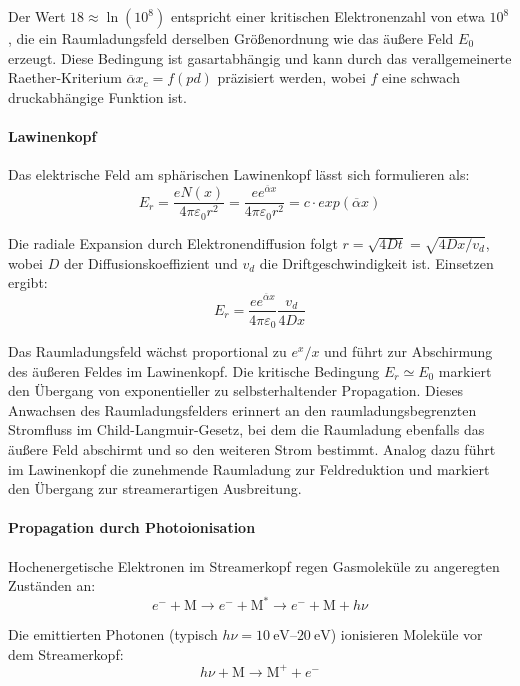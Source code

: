 Der Wert $18 \approx \ln(10^8)$ entspricht einer kritischen Elektronenzahl von etwa $10^8$, die ein Raumladungsfeld derselben Größenordnung wie das äußere Feld $E_0$ erzeugt. Diese Bedingung ist gasartabhängig und kann durch das verallgemeinerte Raether-Kriterium $\overline{\alpha} x_c = f(pd)$ präzisiert werden, wobei $f$ eine schwach druckabhängige Funktion ist.


\paragraph{Lawinenkopf}
Das elektrische Feld am sphärischen Lawinenkopf lässt sich formulieren als:
\begin{equation}
    E_r = \frac{e N(x)}{4\pi \varepsilon_0 r^2} = \frac{e e^{\overline{\alpha}x}}{4\pi \varepsilon_0 r^2} = c \cdot exp(\overline\alpha x)
    \label{eq:electronlawfield}
\end{equation}

Die radiale Expansion durch Elektronendiffusion folgt $r = \sqrt{4Dt} = \sqrt{4Dx/v_d}$, wobei $D$ der Diffusionskoeffizient und $v_d$ die Driftgeschwindigkeit ist. Einsetzen ergibt:
\begin{equation}
    E_r = \frac{e e^{\overline{\alpha}x}}{4\pi \varepsilon_0} \frac{v_d}{4Dx}
    \label{eq:electronlawfielddif}
\end{equation}

Das Raumladungsfeld wächst proportional zu $e^x/x$ und führt zur Abschirmung des äußeren Feldes im Lawinenkopf. Die kritische Bedingung $E_r \simeq E_0$ markiert den Übergang von exponentieller zu selbsterhaltender Propagation.
Dieses Anwachsen des Raumladungsfelders erinnert an den raumladungsbegrenzten Stromfluss im Child-Langmuir-Gesetz, bei dem die Raumladung ebenfalls das äußere Feld abschirmt und so den weiteren Strom bestimmt. Analog dazu führt im Lawinenkopf die zunehmende Raumladung zur Feldreduktion und markiert den Übergang zur streamerartigen Ausbreitung.


\paragraph{Propagation durch Photoionisation}
Hochenergetische Elektronen im Streamerkopf regen Gasmoleküle zu angeregten Zuständen an:
\begin{equation}
    e^- + \text{M} \rightarrow e^- + \text{M}^* \rightarrow e^- + \text{M} + h\nu
\end{equation}

Die emittierten Photonen (typisch $h\nu = \SIrange{10}{20}{\electronvolt}$) ionisieren Moleküle vor dem Streamerkopf:
\begin{equation}
    h\nu + \text{M} \rightarrow \text{M}^+ + e^-
\end{equation}

